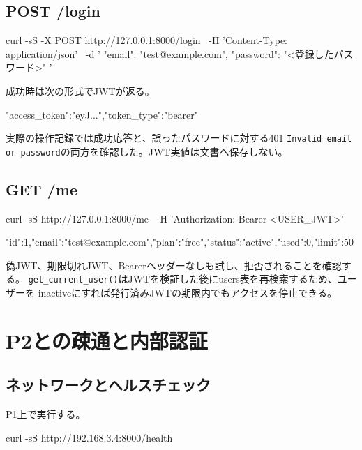 \documentclass[uplatex,dvipdfmx,a4paper,11pt]{jsarticle}
\begin{document}
\subsection{POST /login}

\begin{command}
curl -sS -X POST http://127.0.0.1:8000/login \
  -H 'Content-Type: application/json' \
  -d '{
    "email": "test@example.com",
    "password": "<登録したパスワード>"
  }'
\end{command}

成功時は次の形式でJWTが返る。

\begin{command}
{"access_token":"eyJ...","token_type":"bearer"}
\end{command}

実際の操作記録では成功応答と、誤ったパスワードに対する401
\texttt{Invalid email or password}の両方を確認した。JWT実値は文書へ保存しない。

\subsection{GET /me}

\begin{command}
curl -sS http://127.0.0.1:8000/me \
  -H 'Authorization: Bearer <USER_JWT>'
\end{command}

\begin{command}
{"id":1,"email":"test@example.com","plan":"free","status":"active","used":0,"limit":50}
\end{command}

偽JWT、期限切れJWT、Bearerヘッダーなしも試し、拒否されることを確認する。
\texttt{get\_current\_user()}はJWTを検証した後にusers表を再検索するため、ユーザーを
inactiveにすれば発行済みJWTの期限内でもアクセスを停止できる。

\section{P2との疎通と内部認証}

\subsection{ネットワークとヘルスチェック}

P1上で実行する。

\begin{command}
curl -sS http://192.168.3.4:8000/health
\end{command}
\end{document}
